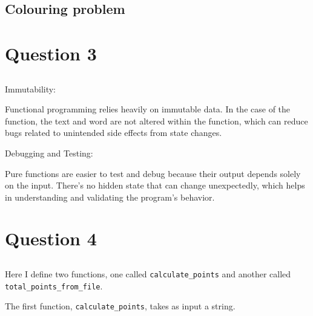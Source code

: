 \documentclass{article}
\begin{document}
\subsection{Colouring problem}


\section{ Question 3}


\subsection{}





\subsection{}



Immutability:

Functional programming relies heavily on immutable data. In the case of the function, the text and word are not altered within the function, which can reduce bugs related to unintended side effects from state changes.

Debugging and Testing:

Pure functions are easier to test and debug because their output depends solely on the input. There’s no hidden state that can change unexpectedly, which helps in understanding and validating the program's behavior.


\subsection{}





\section{Question 4}
\subsection{}


Here I define two functions, one called \texttt{calculate\_points} and another called \texttt{total\_points\_from\_file}.

The first function, \texttt{calculate\_points}, takes as input a string.
\end{document}

